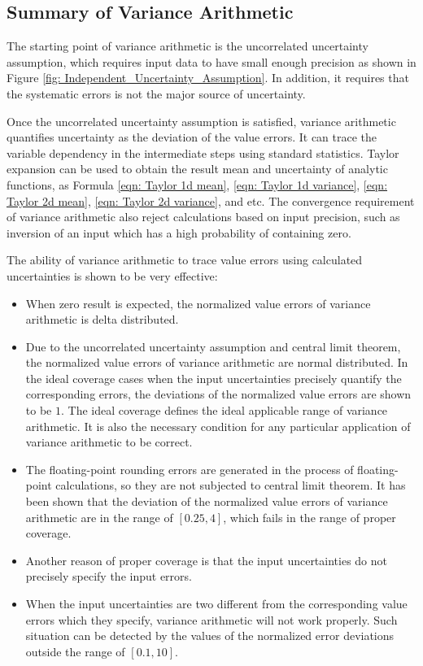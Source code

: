 \documentclass[twoside]{article}
\numberwithin{equation}{section}
\begin{document}
\subsection{Summary of Variance Arithmetic}

The starting point of variance arithmetic is the uncorrelated uncertainty assumption, which requires input data to have small enough precision as shown in Figure \ref{fig: Independent_Uncertainty_Assumption}.  In addition, it requires that the systematic errors is not the major source of uncertainty.

Once the uncorrelated uncertainty assumption is satisfied, variance arithmetic quantifies uncertainty as the deviation of the value errors.
It can trace the variable dependency in the intermediate steps using standard statistics.
Taylor expansion can be used to obtain the result mean and uncertainty of analytic functions, as Formula \eqref{eqn: Taylor 1d mean}, \eqref{eqn: Taylor 1d variance}, \eqref{eqn: Taylor 2d mean}, \eqref{eqn: Taylor 2d variance}, and etc.
The convergence requirement of variance arithmetic also reject calculations based on input precision, such as inversion of an input which has a high probability of containing zero. 

The ability of variance arithmetic to trace value errors using calculated uncertainties is shown to be very effective:
\begin{itemize}
\item When zero result is expected, the normalized value errors of variance arithmetic is delta distributed.

\item Due to the uncorrelated uncertainty assumption and central limit theorem, the normalized value errors of variance arithmetic are normal distributed.
In the ideal coverage cases when the input uncertainties precisely quantify the corresponding errors, the deviations of the normalized value errors are shown to be $1$.
The ideal coverage defines the ideal applicable range of variance arithmetic.
It is also the necessary condition for any particular application of variance arithmetic to be correct.

\item The floating-point rounding errors are generated in the process of floating-point calculations, so they are not subjected to central limit theorem.
It has been shown that the deviation of the normalized value errors of variance arithmetic are in the range of $[0.25, 4]$, which fails in the range of proper coverage.

\item Another reason of proper coverage is that the input uncertainties do not precisely specify the input errors.

\item When the input uncertainties are two different from the corresponding value errors which they specify, variance arithmetic will not work properly.
Such situation can be detected by the values of the normalized error deviations outside the range of $[0.1, 10]$.
\end{itemize}
\end{document}
